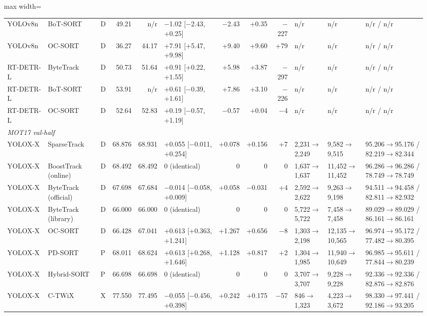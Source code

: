 \begin{sidewaystableorg}
\begin{adjustbox}{max width=\linewidth}
\begin{tabular}{lllrrlrrrlll}
YOLOv8n & BoT-SORT & D & 49.21 & n/r & \ensuremath{-}1.02 [\ensuremath{-}2.43, +0.25] & \ensuremath{-}2.43 & +0.35 & \ensuremath{-}227 & n/r & n/r & n/r / n/r \\
YOLOv8n & OC-SORT & D & 36.27 & 44.17 & +7.91 [+5.47, +9.98] & +9.40 & +9.60 & +79 & n/r & n/r & n/r / n/r \\
RT-DETR-L & ByteTrack & D & 50.73 & 51.64 & +0.91 [+0.22, +1.55] & +5.98 & +3.87 & \ensuremath{-}297 & n/r & n/r & n/r / n/r \\
RT-DETR-L & BoT-SORT & D & 53.91 & n/r & +0.61 [\ensuremath{-}0.39, +1.61] & +7.86 & +3.10 & \ensuremath{-}226 & n/r & n/r & n/r / n/r \\
RT-DETR-L & OC-SORT & D & 52.64 & 52.83 & +0.19 [\ensuremath{-}0.57, +1.19] & \ensuremath{-}0.57 & +0.04 & \ensuremath{-}4 & n/r & n/r & n/r / n/r \\
\multicolumn{12}{l}{\textit{MOT17 val-half}} \\
YOLOX-X & SparseTrack & D & 68.876 & 68.931 & +0.055 [\ensuremath{-}0.011, +0.254] & +0.078 & +0.156 & +7 & 2,231$\to$2,249 & 9,582$\to$9,515 & 95.206$\to$95.176 / 82.219$\to$82.344 \\
YOLOX-X & BoostTrack (online) & D & 68.492 & 68.492 & 0 (identical) & 0 & 0 & 0 & 1,637$\to$1,637 & 11,452$\to$11,452 & 96.286$\to$96.286 / 78.749$\to$78.749 \\
YOLOX-X & ByteTrack (official) & D & 67.698 & 67.684 & \ensuremath{-}0.014 [\ensuremath{-}0.058, +0.009] & +0.058 & \ensuremath{-}0.031 & +4 & 2,592$\to$2,622 & 9,263$\to$9,198 & 94.511$\to$94.458 / 82.811$\to$82.932 \\
YOLOX-X & ByteTrack (library) & D & 66.000 & 66.000 & 0 (identical) & 0 & 0 & 0 & 5,722$\to$5,722 & 7,458$\to$7,458 & 89.029$\to$89.029 / 86.161$\to$86.161 \\
YOLOX-X & OC-SORT & D & 66.428 & 67.041 & +0.613 [+0.363, +1.241] & +1.267 & +0.656 & \ensuremath{-}8 & 1,303$\to$2,198 & 12,135$\to$10,565 & 96.974$\to$95.172 / 77.482$\to$80.395 \\
YOLOX-X & PD-SORT & P & 68.011 & 68.624 & +0.613 [+0.268, +1.646] & +1.128 & +0.817 & +2 & 1,304$\to$1,985 & 11,940$\to$10,649 & 96.985$\to$95.611 / 77.844$\to$80.239 \\
YOLOX-X & Hybrid-SORT & P & 66.698 & 66.698 & 0 (identical) & 0 & 0 & 0 & 3,707$\to$3,707 & 9,228$\to$9,228 & 92.336$\to$92.336 / 82.876$\to$82.876 \\
YOLOX-X & C-TWiX & X & 77.550 & 77.495 & \ensuremath{-}0.055 [\ensuremath{-}0.456, +0.398] & +0.242 & +0.175 & \ensuremath{-}57 & 846$\to$1,323 & 4,223$\to$3,672 & 98.330$\to$97.441 / 92.186$\to$93.205 \\

\end{tabular}
\end{adjustbox}
\end{sidewaystableorg}
